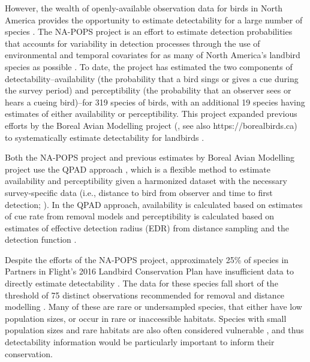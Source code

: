 \par However, the wealth of openly-available observation data for birds in North America provides the opportunity to estimate detectability for a large number of species \citep{bennett_how_2024}. 
The NA-POPS project is an effort to estimate detection probabilities that accounts for variability in detection processes through the use of environmental and temporal covariates for as many of North America’s landbird species as possible \citep{edwards_point_2023}.
To date, the project has estimated the two components of detectability--availability (the probability that a bird sings or gives a cue during the survey period) and perceptibility (the probability that an observer sees or hears a cueing bird)--for 319 species of birds, with an additional 19 species having estimates of either availability or perceptibility. 
This project expanded previous efforts by the Boreal Avian Modelling project (\citet{cumming_toward_2010}, see also https://borealbirds.ca) to systematically estimate detectability for landbirds \citep{solymos_calibrating_2013, solymos_evaluating_2018}.

\par Both the NA-POPS project and previous estimates by Boreal Avian Modelling project use the QPAD approach \citep{solymos_calibrating_2013}, which is a flexible method to estimate availability and perceptibility given a harmonized dataset with the necessary survey-specific data (i.e., distance to bird from observer and time to first detection; \citep{barker_ecological_2015}).
In the QPAD approach, availability is calculated based on estimates of cue rate from removal models \citep{farnsworth_removal_2002, alldredge_time--detection_2007} and perceptibility is calculated based on estimates of effective detection radius (EDR) from distance sampling and the detection function \citep{buckland_introduction_2001}.

\par Despite the efforts of the NA-POPS project, approximately 25\% of species in Partners in Flight’s 2016 Landbird Conservation Plan \citep{rosenberg_partners_2016} have insufficient data to directly estimate detectability \citep{edwards_point_2023}.
The data for these species fall short of the threshold of 75 distinct observations recommended for removal and distance modelling \citep{buckland_introduction_2001, solymos_calibrating_2013}. 
Many of these are rare or undersampled species, that either have low population sizes, or occur in rare or inaccessible habitats.
Species with small population sizes and rare habitats are also often considered vulnerable \citep{davies_synergistic_2004, gray_effects_1989, segura_specialist_2007}, and thus detectability information would be particularly important to inform their conservation.


